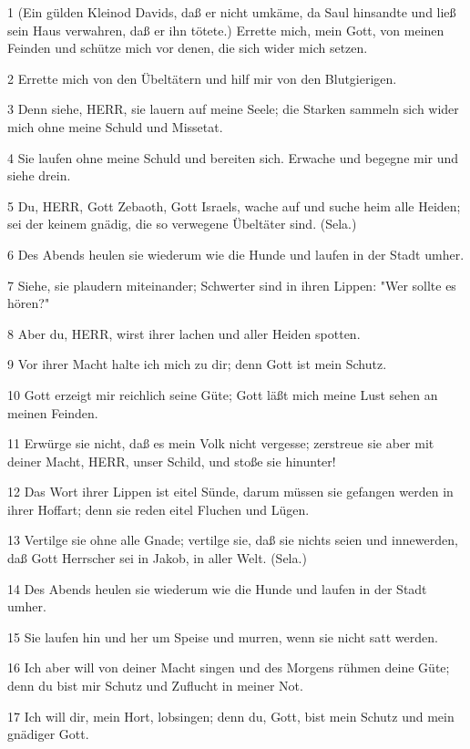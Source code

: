 \par 1 (Ein gülden Kleinod Davids, daß er nicht umkäme, da Saul hinsandte und ließ sein Haus verwahren, daß er ihn tötete.) Errette mich, mein Gott, von meinen Feinden und schütze mich vor denen, die sich wider mich setzen.
\par 2 Errette mich von den Übeltätern und hilf mir von den Blutgierigen.
\par 3 Denn siehe, HERR, sie lauern auf meine Seele; die Starken sammeln sich wider mich ohne meine Schuld und Missetat.
\par 4 Sie laufen ohne meine Schuld und bereiten sich. Erwache und begegne mir und siehe drein.
\par 5 Du, HERR, Gott Zebaoth, Gott Israels, wache auf und suche heim alle Heiden; sei der keinem gnädig, die so verwegene Übeltäter sind. (Sela.)
\par 6 Des Abends heulen sie wiederum wie die Hunde und laufen in der Stadt umher.
\par 7 Siehe, sie plaudern miteinander; Schwerter sind in ihren Lippen: "Wer sollte es hören?"
\par 8 Aber du, HERR, wirst ihrer lachen und aller Heiden spotten.
\par 9 Vor ihrer Macht halte ich mich zu dir; denn Gott ist mein Schutz.
\par 10 Gott erzeigt mir reichlich seine Güte; Gott läßt mich meine Lust sehen an meinen Feinden.
\par 11 Erwürge sie nicht, daß es mein Volk nicht vergesse; zerstreue sie aber mit deiner Macht, HERR, unser Schild, und stoße sie hinunter!
\par 12 Das Wort ihrer Lippen ist eitel Sünde, darum müssen sie gefangen werden in ihrer Hoffart; denn sie reden eitel Fluchen und Lügen.
\par 13 Vertilge sie ohne alle Gnade; vertilge sie, daß sie nichts seien und innewerden, daß Gott Herrscher sei in Jakob, in aller Welt. (Sela.)
\par 14 Des Abends heulen sie wiederum wie die Hunde und laufen in der Stadt umher.
\par 15 Sie laufen hin und her um Speise und murren, wenn sie nicht satt werden.
\par 16 Ich aber will von deiner Macht singen und des Morgens rühmen deine Güte; denn du bist mir Schutz und Zuflucht in meiner Not.
\par 17 Ich will dir, mein Hort, lobsingen; denn du, Gott, bist mein Schutz und mein gnädiger Gott.

